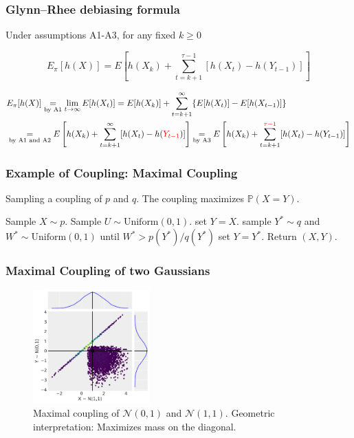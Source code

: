 \documentclass[aspectratio=169]{beamer}
\begin{document}
\begin{frame}
	\frametitle{Glynn--Rhee debiasing formula}
	\begin{theorem}
		Under assumptions A1-A3, for any fixed $k \geq 0$

		\[
			E_\pi[h(X)]  =E[h(X_k) + \sum_{t=k+1}^{\tau-1} [h(X_t) - h(Y_{t-1})] ]
		\]
	\end{theorem}

	\begin{align*}
		 & E_\pi[h(X)] \underset{\text{by A1}}{=} \lim_{t \to \infty} E[h(X_t)] = E[h(X_k)] + \sum_{t=k+1}^{\infty} \{E[h(X_t)] - E[h(X_{t-1})]\} \\
		 & \underset{\text{by A1 and A2}}{=} E\left[h(X_k) + \sum_{t=k+1}^{\infty} [h(X_t) - h(\textcolor{red}{Y_{t-1}})]\right]
		\underset{\text{by A3}}{=} E\left[h(X_k) + \sum_{t=k+1}^{\textcolor{red}{\tau-1}} [h(X_t) - h(Y_{t-1})]\right]
	\end{align*}

\end{frame}

\begin{frame}
	\frametitle{Example of Coupling: Maximal Coupling}
	\begin{algorithm}[H]
		\caption{Sampling a coupling of $p$ and $q$. The coupling maximizes $\mathbb{P}(X = Y)$.}
		\begin{algorithmic}[1]
			\STATE Sample $X \sim p$.
			\STATE Sample $U \sim \text{Uniform}(0, 1)$.
			\STATE set $Y = X$.
			\ELSE
			\STATE sample $Y^* \sim q$ and $W^* \sim \text{Uniform}(0, 1)$ until $W^* > p(Y^*)/q(Y^*)$
			\ENDWHILE
			\STATE set $Y = Y^*$.
			\ENDIF
			\STATE Return $(X, Y)$.
		\end{algorithmic}
	\end{algorithm}
\end{frame}

\begin{frame}
	\frametitle{Maximal Coupling of two Gaussians}
	\begin{figure}[h]
		\centering
		\includegraphics[width=0.4\textwidth]{maximal_coupling_plot.pdf}
		\caption{Maximal coupling of $\mathcal{N}(0, 1)$ and $\mathcal{N}(1, 1)$. Geometric interpretation: Maximizes mass on the diagonal.}
	\end{figure}
\end{frame}
\end{document}
